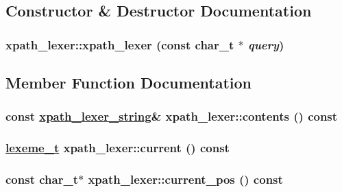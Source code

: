 \subsection{Constructor \& Destructor Documentation}
\hypertarget{classxpath__lexer_a52661c9ba7dfa262d3ab49f578653c3}{
\subsubsection[xpath\_\-lexer]{\setlength{\rightskip}{0pt plus 5cm}xpath\_\-lexer::xpath\_\-lexer (const char\_\-t $\ast$ {\em query})}}
\label{classxpath__lexer_a52661c9ba7dfa262d3ab49f578653c3}




\subsection{Member Function Documentation}
\hypertarget{classxpath__lexer_ebb02b6d507f5e0839bfa42116bdbc9c}{
\subsubsection[contents]{\setlength{\rightskip}{0pt plus 5cm}const \hyperlink{structxpath__lexer__string}{xpath\_\-lexer\_\-string}\& xpath\_\-lexer::contents () const}}
\label{classxpath__lexer_ebb02b6d507f5e0839bfa42116bdbc9c}


\hypertarget{classxpath__lexer_06cdc258948ef3a1a69bd7d5733fd987}{
\subsubsection[current]{\setlength{\rightskip}{0pt plus 5cm}\hyperlink{pugixml_8cpp_1fdd6d0a63acbba1491ab331ddce4ac9}{lexeme\_\-t} xpath\_\-lexer::current () const}}
\label{classxpath__lexer_06cdc258948ef3a1a69bd7d5733fd987}


\hypertarget{classxpath__lexer_7adef722d64938e3ba79ae1a7e1c0d71}{
\subsubsection[current\_\-pos]{\setlength{\rightskip}{0pt plus 5cm}const char\_\-t$\ast$ xpath\_\-lexer::current\_\-pos () const}}
\label{classxpath__lexer_7adef722d64938e3ba79ae1a7e1c0d71}


